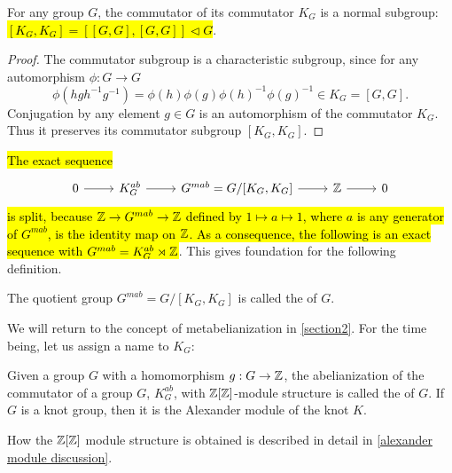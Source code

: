 \begin{lemma}
  For any group $G$, the commutator of its commutator $K_G$ is a normal subgroup: \hl{$[K_G, K_G]=[[G, G], [G, G]]\triangleleft G$}. 
\end{lemma}

\begin{proof}
  The commutator subgroup is a characteristic subgroup, since for any automorphism $\phi:G\to G$ 
  $$\phi(hgh^{-1}g^{-1})=\phi(h)\phi(g)\phi(h)^{-1}\phi(g)^{-1}\in K_G=[G, G].$$
  Conjugation by any element $g\in G$ is an automorphism of the commutator $K_G$. Thus it preserves its commutator subgroup $[K_G, K_G]$. 
\end{proof}

\hl{The exact sequence}
\begin{equation}\label{split sequence metab}
  \begin{tikzcd}
    0\arrow[r] & K_G^{ab} \arrow[r] & G^{mab}=G/[K_G, K_G]\arrow[r] & \Z \arrow[r] & 0
  \end{tikzcd}
\end{equation}
\hl{is split, because $\operatorname{\mathbb{Z}}\to G^{mab}\to\operatorname{\mathbb{Z}}$ defined by $1\mapsto a\mapsto 1$, where $a$ is any generator of $G^{mab}$, is the identity map on $\operatorname{\mathbb{Z}}$. As a consequence, the following is an exact sequence with $G^{mab}=K^{ab}_G \rtimes \operatorname{\mathbb{Z}}$}. This gives foundation for the following definition.


\begin{definition}[metabelianization]\label{metab def}
  The quotient group $G^{mab}=G/[K_G, K_G]$ is called the  of $G$. 
\end{definition}

We will return to the concept of metabelianization in \cref{section2}. For the time being, let us assign a name to $K_G$:

\begin{definition}\label{alexander module def}
  Given a group $G$ with a homomorphism $g:G\to \operatorname{\mathbb{Z}}$, the abelianization of the commutator of a group $G$, $K_G^{ab}$, with $\operatorname{\mathbb{Z}}[\operatorname{\mathbb{Z}}]$-module structure is called the  of $G$. If $G$ is a knot group, then it is the Alexander module of the knot $K$.
\end{definition}

How the $\operatorname{\mathbb{Z}}[\operatorname{\mathbb{Z}}]$ module structure is obtained is described in detail in \cref{alexander module discussion}.




